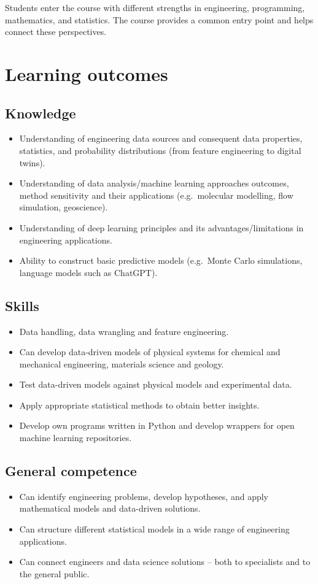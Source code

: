 \documentclass[letterpaper,12pt,oneside]{article}
\begin{document}
Students enter the course with different strengths in engineering, programming, mathematics, and statistics. The course provides a common entry point and helps connect these perspectives.

\section*{Learning outcomes}

\subsection*{Knowledge}
\begin{itemize}
\item Understanding of engineering data sources and consequent data properties, statistics, and probability distributions (from feature engineering to digital twins).
\item Understanding of data analysis/machine learning approaches outcomes, method sensitivity and their applications (e.g.\ molecular modelling, flow simulation, geoscience).
\item Understanding of deep learning principles and its advantages/limitations in engineering applications.
\item Ability to construct basic predictive models (e.g.\ Monte Carlo simulations, language models such as ChatGPT).
\end{itemize}

\subsection*{Skills}
\begin{itemize}
\item Data handling, data wrangling and feature engineering.
\item Can develop data-driven models of physical systems for chemical and mechanical engineering, materials science and geology.
\item Test data-driven models against physical models and experimental data.
\item Apply appropriate statistical methods to obtain better insights.
\item Develop own programs written in Python and develop wrappers for open machine learning repositories.
\end{itemize}

\subsection*{General competence}
\begin{itemize}
\item Can identify engineering problems, develop hypotheses, and apply mathematical models and data-driven solutions.
\item Can structure different statistical models in a wide range of engineering applications.
\item Can connect engineers and data science solutions -- both to specialists and to the general public.
\end{itemize}
\end{document}
